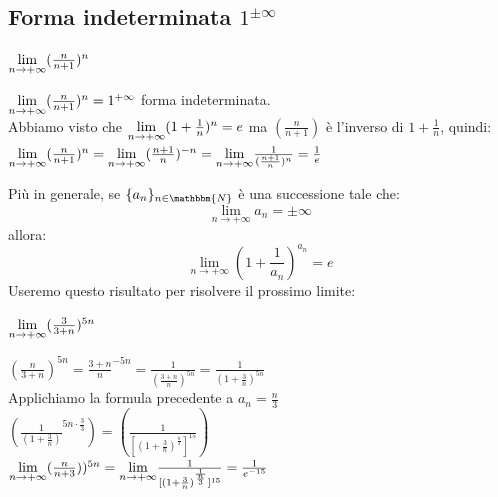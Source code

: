 \documentclass[12pt]{report}
\newcounter{exercise}
\begin{document}
	\subsection{Forma indeterminata $1^{\pm\infty}$}
	\begin{assignment}{}{}
		$\mathlarger{\lim_{n \to +\infty}}(\frac{n}{n + 1})^n$
		\begin{exercise}{}{}
			$\mathlarger{\lim_{n \to +\infty}}(\frac{n}{n + 1})^n = 1^{+\infty}$ forma indeterminata.\\
			Abbiamo visto che $\mathlarger{\lim_{n \to +\infty}}(1 + \frac{1}{n})^n = e$ ma $(\frac{n}{n + 1})$ è l'inverso di $1 + \frac{1}{n}$, quindi:\\
			$\mathlarger{\lim_{n \to +\infty}}(\frac{n}{n + 1})^n = \mathlarger{\lim_{n \to +\infty}}(\frac{n+1}{n})^{-n} = \mathlarger{\lim_{n \to +\infty}}\frac{1}{(\frac{n+1}{n})^n} = \frac{1}{e}$
		\end{exercise}
	\end{assignment}
	Più in generale, se $\{a_n\}_{n \in \mathbbm{N}}$ è una successione tale che:
	\[
	\lim_{n \to +\infty}a_n = \pm\infty
	\]
	allora:
	\[
	\lim_{n \to +\infty}(1 + \frac{1}{a_n})^{a_n} = e
	\]
	Useremo questo risultato per risolvere il prossimo limite:
	\begin{assignment}{}{}
		$\mathlarger{\lim_{n \to +\infty}}(\frac{3}{3 + n})^{5n}$
		\begin{exercise}{}{}
			$(\frac{n}{3 + n})^{5n} = \frac{3 + n}{n}^{-5n} = \frac{1}{(\frac{3 + n}{n})^{5n}} = \frac{1}{(1 + \frac{3}{n})^{5n}}$ \\
			Applichiamo la formula precedente a $a_n = \frac{n}{3}$ \\
			$(\frac{1}{(1 + \frac{3}{n})}^{5n \cdot \frac{3}{3}}) = (\frac{1}{[(1 + \frac{3}{n})^{\frac{n}{3}}]^{15}})$ \\
			$\mathlarger{\lim_{n \to +\infty}}(\frac{n}{n + 3}))^{5n} = \mathlarger{\lim_{n \to +\infty}}\frac{1}{[(1 + \frac{3}{n})^{\frac{1}{\frac{n}{3}}}]^{15}} = \frac{1}{e^{-15}}$
		\end{exercise}
	\end{assignment}
\end{document}
